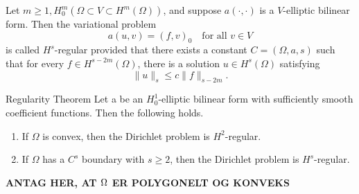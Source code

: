 \begin{defn}
    Let $m\geq 1, H^m_0(\Omega\subset V\subset H^m(\Omega))$, and suppose $a(\cdot,\cdot)$ is a $V$-elliptic bilinear form. 
    Then the variational problem
    \begin{equation}
        a(u,v) = {(f,v)}_0\quad \text{for all } v\in V
    \end{equation}
    is called $H^s$-regular provided that there exists a constant $C=(\Omega,a,s)$ such that for every  $f\in H^{s-2m}(\Omega)$,
    there is a solution $u\in H^s(\Omega)$ satisfying
    \begin{equation}
        \|u\|_s\leq c\|f\|_{s-2m}.
    \end{equation}\label{defn:7.1}
\end{defn}

\begin{thmx}{Regularity Theorem}
    Let a be an $H^1_0$-elliptic bilinear form with sufficiently smooth coefficient functions. Then the following holds. 
    \begin{enumerate}
        \item If $\Omega$ is convex, then the Dirichlet problem is $H^2$-regular. 
        \item If $\Omega$ has a $C^s$ boundary with $s\geq 2$, then the Dirichlet problem is $H^s$-regular.
    \end{enumerate}
\end{thmx}

\textbf{ANTAG HER, AT $\Omega$ ER POLYGONELT OG KONVEKS}

